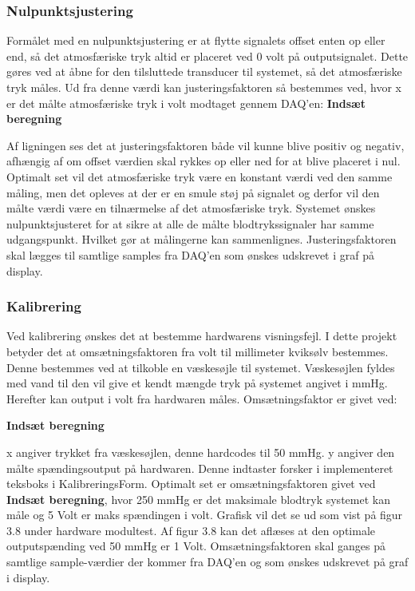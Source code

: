 \subsubsection{Nulpunktsjustering}
Formålet med en nulpunktsjustering er at flytte signalets offset enten op eller end, så det atmosfæriske tryk altid er placeret ved 0 volt på outputsignalet. Dette gøres ved at åbne for den tilsluttede transducer til systemet, så det atmosfæriske tryk måles. Ud fra denne værdi kan justeringsfaktoren så bestemmes ved, hvor x er det målte atmosfæriske tryk i volt modtaget gennem DAQ’en:
\textbf{Indsæt beregning}

Af ligningen ses det at justeringsfaktoren både vil kunne blive positiv og negativ, afhængig af om offset værdien skal rykkes op eller ned for at blive placeret i nul. Optimalt set vil det atmosfæriske tryk være en konstant værdi ved den samme måling, men det opleves at der er en smule støj på signalet og derfor vil den målte værdi være en tilnærmelse af det atmosfæriske tryk. Systemet ønskes nulpunktsjusteret for at sikre at alle de målte blodtrykssignaler har samme udgangspunkt. Hvilket gør at målingerne kan sammenlignes. Justeringsfaktoren skal lægges til samtlige samples fra DAQ’en som ønskes udskrevet i graf på display. 

\subsubsection{Kalibrering}
Ved kalibrering ønskes det at bestemme hardwarens visningsfejl. I dette projekt betyder det at omsætningsfaktoren fra volt til millimeter kviksølv bestemmes. Denne bestemmes ved at tilkoble en væskesøjle til systemet. Væskesøjlen fyldes med vand til den vil give et kendt mængde tryk på systemet angivet i mmHg. Herefter kan output i volt fra hardwaren måles. Omsætningsfaktor er givet ved:

\textbf{Indsæt beregning}

x angiver trykket fra væskesøjlen, denne hardcodes til 50 mmHg. y angiver den målte spændingsoutput på hardwaren. Denne indtaster forsker i implementeret teksboks i KalibreringsForm. Optimalt set er omsætningsfaktoren givet ved \textbf{Indsæt beregning}, hvor 250 mmHg er det maksimale blodtryk systemet kan måle og 5 Volt er maks spændingen i volt. Grafisk vil det se ud som vist på figur 3.8 under hardware modultest. Af figur 3.8 kan det aflæses at den optimale outputspænding ved 50 mmHg er 1 Volt. Omsætningsfaktoren skal ganges på samtlige sample-værdier der kommer fra DAQ’en og som ønskes udskrevet på graf i display. 

